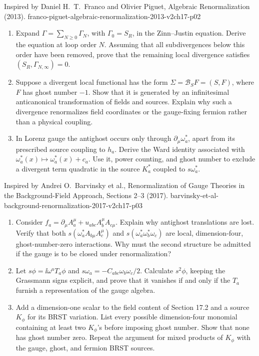 \begin{enumerate}
  {Inspired by Daniel H.\ T.\ Franco and Olivier Piguet, Algebraic Renormalization (2013).}
  {franco-piguet-algebraic-renormalization-2013-v2ch17-p02}
  \begin{enumerate}
    \item[(a)]
    Expand \(\Gamma=\sum_{N\geq0}\Gamma_N\), with
    \(\Gamma_0=S_R\), in the Zinn--Justin equation.  Derive the equation at
    loop order \(N\).  Assuming that all subdivergences below this order have
    been removed, prove that the remaining local divergence satisfies
    \((S_R,\Gamma_{N,\infty})=0\).
    \item[(b)]
    Suppose a divergent local functional has the form
    \(\Sigma=\mathcal B_SF=(S,F)\), where \(F\) has ghost number \(-1\).
    Show that it is generated by an infinitesimal anticanonical
    transformation of fields and sources.  Explain why such a divergence
    renormalizes field coordinates or the gauge-fixing fermion rather than a
    physical coupling.
    \item[(c)]
    In Lorenz gauge the antighost occurs only through
    \(\partial_\mu\omega_a^*\), apart from its prescribed source
    coupling to \(h_a\).  Derive the Ward identity associated with
    \(\omega_a^*(x)\mapsto\omega_a^*(x)+c_a\).  Use it,
    power counting, and ghost number to exclude a divergent term quadratic
    in the source \(K_a^*\) coupled to \(s\omega_a^*\).
  \end{enumerate}

  {Inspired by Andrei O.\ Barvinsky et al., Renormalization of Gauge Theories in the Background-Field Approach, Sections 2--3 (2017).}
  {barvinsky-et-al-background-renormalization-2017-v2ch17-p03}
  \begin{enumerate}
    \item[(a)]
    Consider
    \(f_a=\partial_\mu A_a^\mu+
    u_{abc}A_b^\mu A_{c\mu}\).
    Explain why antighost translations are lost.  Verify that both
    \(s(\omega_a^*A_{b\mu}A_c^\mu)\) and
    \(s(\omega_a^*\omega_b^*\omega_c)\) are local,
    dimension-four, ghost-number-zero interactions.  Why must the second
    structure be admitted if the gauge is to be closed under
    renormalization?
    \item[(b)]
    Let \(s\phi=\ii\omega^a T_a\phi\) and
    \(s\omega_a=-C_{abc}
    \omega_b\omega_c/2\).  Calculate \(s^2\phi\), keeping the
    Grassmann signs explicit, and prove that it vanishes if and only if the
    \(T_a\) furnish a representation of the gauge algebra.
    \item[(c)]
    Add a dimension-one scalar to the field content of Section 17.2 and a
    source \(K_{\phi}\) for its BRST variation.  List every possible
    dimension-four monomial containing at least two \(K_\phi\)'s before
    imposing ghost number.  Show that none has ghost number zero.  Repeat
    the argument for mixed products of \(K_\phi\) with the gauge, ghost, and
    fermion BRST sources.
  \end{enumerate}


\end{enumerate}
